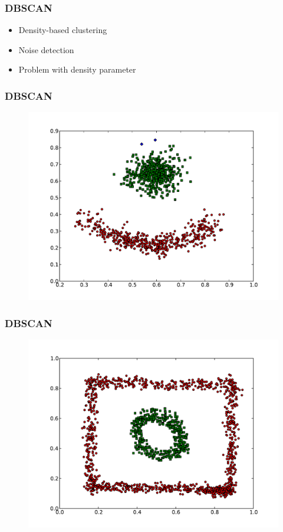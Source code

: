 \documentclass{beamer}
\begin{document}
\begin{frame}
\frametitle{DBSCAN}
    \begin{itemize}
	\item Density-based clustering
    	\item Noise detection
   	\item Problem with density parameter
    \end{itemize}
\end{frame}

\begin{frame}
\frametitle{DBSCAN}
    \begin{figure}[]
    \includegraphics[scale=0.5]{dbscan_red-blue-clusters.pdf}
    \end{figure}
\end{frame}

\begin{frame}
\frametitle{DBSCAN}
    \begin{figure}[]
    \includegraphics[scale=0.5]{dbscan_circle-weird.pdf}
    \end{figure}
\end{frame}
\end{document}
